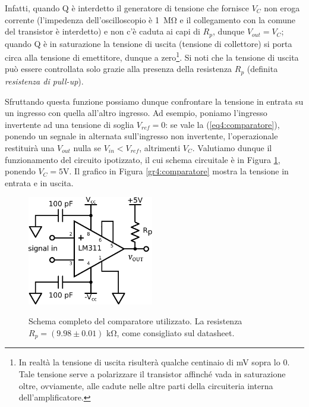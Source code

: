 Infatti, quando Q è interdetto il generatore di tensione che fornisce $V_C$ non eroga corrente (l'impedenza dell'oscilloscopio è \SI{1}{\Mohm} e il collegamento con la comune del transistor è interdetto) e non c'è caduta ai capi di $R_p$, dunque $V_{out}=V_C$; quando Q è in saturazione la tensione di uscita (tensione di collettore) si porta circa alla tensione di emettitore, dunque a zero\footnote{In realtà la tensione di uscita risulterà qualche centinaio di \si{\milli\volt} sopra lo $0$. Tale tensione serve a polarizzare il transistor affinché vada in saturazione oltre, ovviamente, alle cadute nelle altre parti della circuiteria interna dell'amplificatore.}. Si noti che la tensione di uscita può essere controllata solo grazie alla presenza della resistenza $R_p$ (definita \textit{resistenza di pull-up}).

Sfruttando questa funzione possiamo dunque confrontare la tensione in entrata su un ingresso con quella all'altro ingresso. Ad esempio, poniamo l'ingresso invertente ad una tensione di soglia $V_{ref}=0$: se vale la (\ref{eq4:comparatore}), ponendo un segnale in alternata sull'ingresso non invertente, l'operazionale restituirà una $V_{out}$ nulla se $V_{in}<V_{ref}$, altrimenti $V_C$. Valutiamo dunque il funzionamento del circuito ipotizzato, il cui schema circuitale è in Figura \ref{cir4:comparatore}, ponendo $V_{C}=5$\si{\volt}. Il grafico in Figura \ref{gr4:comparatore} mostra la tensione in entrata e in uscita.

\begin{figure}[ht]
 \centering
   {\includegraphics[width=5.5cm]{../E04/latex/c_comparatore.pdf}}
 \caption{Schema completo del comparatore utilizzato. La resistenza $R_p=(9.98 \pm 0.01)$ \si{\kilo\ohm}, come consigliato sul datasheet.}
 \label{cir4:comparatore}
\end{figure}

